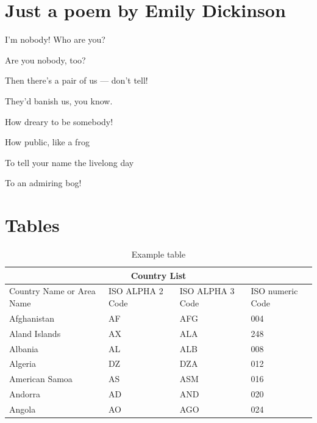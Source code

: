 \documentclass{imc-rai}
\begin{document}
\section {Just a poem by Emily Dickinson}

I'm nobody! Who are you?

Are you nobody, too?

Then there's a pair of us — don't tell!

They'd banish us, you know.

How dreary to be somebody!

How public, like a frog

To tell your name the livelong day

To an admiring bog!

\section{Tables}

\begin{table}[ht]
\begin{tabular}{ |p{3cm}||p{3cm}|p{3cm}|p{3cm}|  }
	\hline
	\multicolumn{4}{|c|}{Country List} \\
	\hline
	Country Name     or Area Name& ISO ALPHA 2 Code &ISO ALPHA 3 Code&ISO numeric Code\\
	\hline
	Afghanistan   & AF    &AFG&   004\\
	Aland Islands&   AX  & ALA   &248\\
	Albania &AL & ALB&  008\\
	Algeria    &DZ & DZA&  012\\
	American Samoa&   AS  & ASM&016\\
	Andorra& AD  & AND   &020\\
	Angola& AO  & AGO&024\\
	\hline
\end{tabular}
\caption{\label{tab:table-name}Example table}
\end{table}



%
%
%
%
%

\backmatter%
	
 \typeout{}
	
	
\end{document}

